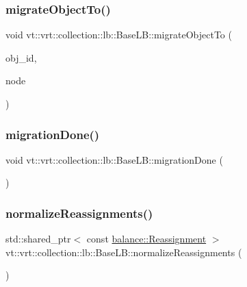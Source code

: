 \subsubsection{\texorpdfstring{migrate\+Object\+To()}{migrateObjectTo()}}
{\footnotesize\ttfamily void vt\+::vrt\+::collection\+::lb\+::\+Base\+L\+B\+::migrate\+Object\+To (\begin{DoxyParamCaption}\item[{\hyperlink{structvt_1_1vrt_1_1collection_1_1lb_1_1_base_l_b_a790b22acf448880599724749cdc4e9b3}{Obj\+I\+D\+Type} const}]{obj\+\_\+id,  }\item[{\hyperlink{namespacevt_a866da9d0efc19c0a1ce79e9e492f47e2}{Node\+Type} const}]{node }\end{DoxyParamCaption})}

\mbox{\label{structvt_1_1vrt_1_1collection_1_1lb_1_1_base_l_b_ac8ed2cc09aec1f84e179ba734da71960}} 
\subsubsection{\texorpdfstring{migration\+Done()}{migrationDone()}}
{\footnotesize\ttfamily void vt\+::vrt\+::collection\+::lb\+::\+Base\+L\+B\+::migration\+Done (\begin{DoxyParamCaption}{ }\end{DoxyParamCaption})}

\mbox{\label{structvt_1_1vrt_1_1collection_1_1lb_1_1_base_l_b_a9ecdb512cc5a87d637e48ab8d5b49b43}} 
\subsubsection{\texorpdfstring{normalize\+Reassignments()}{normalizeReassignments()}}
{\footnotesize\ttfamily std\+::shared\+\_\+ptr$<$ const \hyperlink{structvt_1_1vrt_1_1collection_1_1balance_1_1_reassignment}{balance\+::\+Reassignment} $>$ vt\+::vrt\+::collection\+::lb\+::\+Base\+L\+B\+::normalize\+Reassignments (\begin{DoxyParamCaption}{ }\end{DoxyParamCaption})\hspace{0.3cm}{\ttfamily [protected]}}



